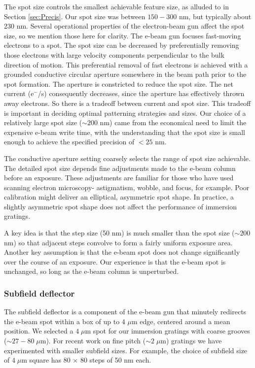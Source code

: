 \documentclass[]{spie}  %
\begin{document}
The spot size controls the smallest achievable feature size, as alluded to in Section \ref{sec:Precis}.  Our spot size was between $150-300$ nm, but typically about 230 nm.  Several operational properties of the electron-beam gun affect the spot size, so we mention those here for clarity.  The e-beam gun focuses fast-moving electrons to a spot.  The spot size can be decreased by preferentially removing those electrons with large velocity components perpendicular to the bulk direction of motion.  This preferential removal of fast electrons is achieved with a grounded conductive circular aperture somewhere in the beam path prior to the spot formation.  The aperture is constricted to reduce the spot size.  The net current (e$^-$/s) consequently decreases, since the aperture has effectively thrown away electrons.  So there is a tradeoff between current and spot size.  This tradeoff is important in deciding optimal patterning strategies and sizes.  Our choice of a relatively large spot size ($\sim 200$ nm) came from the economical need to limit the expensive e-beam write time, with the understanding that the spot size is small enough to achieve the specified precision of $< 25$ nm.

The conductive aperture setting coarsely selects the range of spot size achievable.  The detailed spot size depends fine adjustments made to the e-beam column before an exposure.  These adjustments are familiar for those who have used scanning electron microscopy- astigmatism, wobble, and focus, for example.  Poor calibration might deliver an elliptical, asymmetric spot shape.  In practice, a slightly asymmetric spot shape does not affect the performance of immersion gratings.

A key idea is that the step size (50 nm) is much smaller than the spot size ($\sim200$ nm) so that adjacent steps convolve to form a fairly uniform exposure area.  Another key assumption is that the e-beam spot does not change significantly over the course of an exposure.  Our experience is that the e-beam spot is unchanged, so long as the e-beam column is unperturbed.

\subsubsection{Subfield deflector}
The subfield deflector is a component of the e-beam gun that minutely redirects the e-beam spot within a box of up to 4 $\mu$m edge, centered around a mean position.  We selected a $4 \; \mu$m spot for our immersion gratings with coarse grooves ($\sim 27-80 \; \mu$m).  For recent work on fine pitch ($\sim2\; \mu$m) gratings we have experimented with smaller subfield sizes.  For example, the choice of subfield size of $4 \; \mu$m square has 80 $\times$ 80 steps of 50 nm each. 
\end{document}
